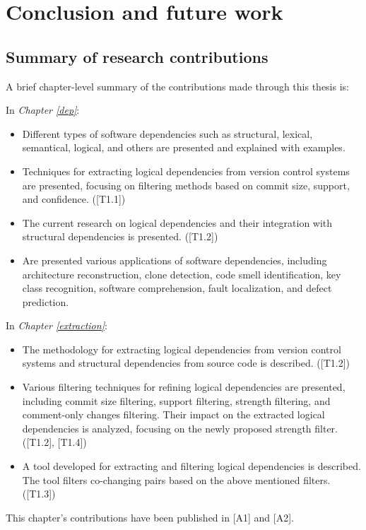 \chapter{Conclusion and future work}

\section{Summary of research contributions}

\hspace{4em}A brief chapter-level summary of the contributions made through this thesis is:

\noindent In \textit{Chapter \ref{dep}}:
\begin{itemize}
    \item Different types of software dependencies such as structural, lexical, semantical, logical, and others are presented and explained with examples.
    \item Techniques for extracting logical dependencies from version control systems are presented, focusing on filtering methods based on commit size, support, and confidence. \hfill ([T1.1])
    \item The current research on logical dependencies and their integration with structural dependencies is presented. \hfill ([T1.2])
    \item Are presented various applications of software dependencies, including architecture reconstruction, clone detection, code smell identification, key class recognition, software comprehension, fault localization, and defect prediction. 
\end{itemize}

\noindent In \textit{Chapter \ref{extraction}}:
\begin{itemize}
    \item The methodology for extracting logical dependencies from version control systems and structural dependencies from source code is described. \hfill ([T1.2])
    \item Various filtering techniques for refining logical dependencies are presented, including commit size filtering, support filtering, strength filtering, and comment-only changes filtering. Their impact on the extracted logical dependencies is analyzed, focusing on the newly proposed strength filter. \hfill ([T1.2], [T1.4])
    \item A tool developed for extracting and filtering logical dependencies is described. The tool filters co-changing pairs based on the above mentioned filters. \hfill ([T1.3])
\end{itemize}
This chapter's contributions have been published in [A1] and [A2].

